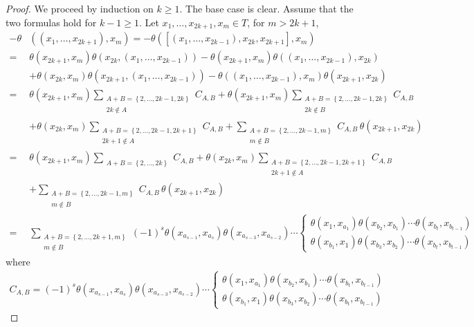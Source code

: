 \documentclass[11pt, twoside]{article}
\begin{document}
\begin{proof}
    We proceed by induction on $k\geq 1$. The base case is clear. Assume that the two formulas hold for $k-1\geq 1$. Let $x_1,\ldots,x_{2k+1},x_m\in T$, for $m>2k+1$, \begin{align*}
        -\theta&((x_1,\ldots,x_{2k+1}),x_m)= -\theta([(x_1,\ldots,x_{2k-1}),x_{2k},x_{2k+1}],x_m) \\ =& \theta(x_{2k+1},x_m)\theta(x_{2k},(x_1,\ldots,x_{2k-1}))- \theta(x_{2k+1},x_m)\theta((x_1,\ldots,x_{2k-1}),x_{2k})\\ & + \theta(x_{2k},x_m)\theta(x_{2k+1},(x_1,\ldots,x_{2k-1})) - \theta((x_1,\ldots,x_{2k-1}),x_m)\theta(x_{2k+1},x_{2k}) \\ =& \theta(x_{2k+1},x_m)\sum_{\substack{A+B=\left\{2,\ldots,2k-1,2k\right\}\\ 2k\notin A}} C_{A,B}+ \theta(x_{2k+1},x_m)\sum_{\substack{A+B=\left\{2,\ldots,2k-1,2k\right\}\\ 2k\notin B}} C_{A,B} \\ & + \theta(x_{2k},x_m)\sum_{\substack{A+B=\left\{2,\ldots,2k-1,2k+1\right\}\\ 2k+1\notin A}} C_{A,B} + \sum_{\substack{A+B=\left\{2,\ldots,2k-1,m\right\}\\ m\notin B}} C_{A,B}\, \theta(x_{2k+1},x_{2k}) \\ =& \theta(x_{2k+1},x_m)\sum_{\substack{A+B=\left\{2,\ldots,2k\right\}}} C_{A,B} + \theta(x_{2k},x_m)\sum_{\substack{A+B=\left\{2,\ldots,2k-1,2k+1\right\}\\ 2k+1\notin A}}  C_{A,B}\\ &+ \sum_{\substack{A+B=\left\{2,\ldots,2k-1,m\right\}\\ m\notin B}} C_{A,B}\, \theta(x_{2k+1},x_{2k}) \\ =& \sum_{\substack{A+B=\left\{2,\ldots,2k+1,m\right\}\\ m\notin B}}(-1)^s\theta(x_{a_{s-1}},x_{a_s})\theta(x_{a_{s-3}},x_{a_{s-2}})\cdots \left\{\begin{matrix}
\theta (x_1,x_{a_1})\theta(x_{b_2},x_{b_1})\cdots\theta(x_{b_t},x_{b_{t-1}}) \\\theta (x_{b_1},x_1)\theta(x_{b_3},x_{b_2})\cdots\theta(x_{b_t},x_{b_{t-1}})
\end{matrix}\right. 
    \end{align*} where \begin{align*}
        C_{A,B}=(-1)^s\theta(x_{a_{s-1}},x_{a_s})\theta(x_{a_{s-3}},x_{a_{s-2}})\cdots \left\{\begin{matrix}
\theta (x_1,x_{a_1})\theta(x_{b_2},x_{b_1})\cdots\theta(x_{b_t},x_{b_{t-1}}) \\\theta (x_{b_1},x_1)\theta(x_{b_3},x_{b_2})\cdots\theta(x_{b_t},x_{b_{t-1}})

\end{matrix}
\end{align*}
\end{proof}
\end{document}
